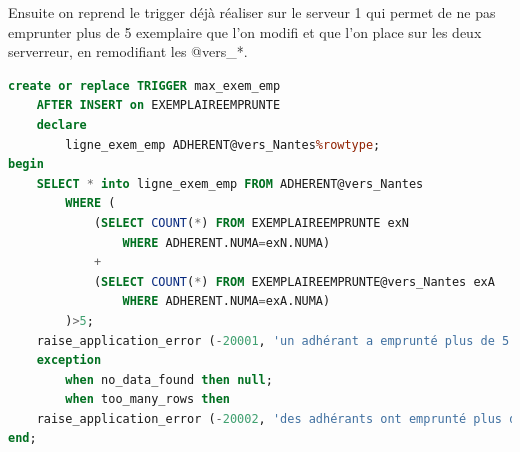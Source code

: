 \documentclass{article}
\begin{document}
Ensuite on reprend le trigger déjà réaliser sur le serveur 1 qui permet de ne pas emprunter plus de 5 exemplaire que l'on modifi et que l'on place sur les deux serverreur, en remodifiant les @vers\_*.
\begin{lstlisting}[language=SQL, caption= Trigger Max exemplaire DB2]
create or replace TRIGGER max_exem_emp
    AFTER INSERT on EXEMPLAIREEMPRUNTE
    declare
        ligne_exem_emp ADHERENT@vers_Nantes%rowtype;
begin
    SELECT * into ligne_exem_emp FROM ADHERENT@vers_Nantes 
        WHERE (
            (SELECT COUNT(*) FROM EXEMPLAIREEMPRUNTE exN
                WHERE ADHERENT.NUMA=exN.NUMA)
            +
            (SELECT COUNT(*) FROM EXEMPLAIREEMPRUNTE@vers_Nantes exA
                WHERE ADHERENT.NUMA=exA.NUMA)
        )>5;
    raise_application_error (-20001, 'un adhérant a emprunté plus de 5 exemplaires');
    exception
        when no_data_found then null;
        when too_many_rows then
    raise_application_error (-20002, 'des adhérants ont emprunté plus de 5 exemplaires');
end;
\end{lstlisting}
\end{document}

